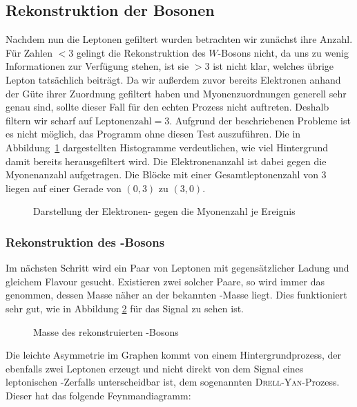 \subsection{Rekonstruktion der Bosonen}
Nachdem nun die Leptonen gefiltert wurden betrachten wir zunächst ihre Anzahl.
Für Zahlen $< 3$ gelingt die Rekonstruktion des $W$-Bosons nicht, da uns zu
wenig Informationen zur Verfügung stehen, ist sie $> 3$ ist nicht klar, welches
übrige Lepton tatsächlich beiträgt. Da wir außerdem zuvor bereits Elektronen
anhand der Güte ihrer Zuordnung gefiltert haben und Myonenzuordnungen generell
sehr genau sind, sollte dieser Fall für den echten Prozess nicht auftreten.
Deshalb filtern wir scharf auf $\text{Leptonenzahl} = 3$. Aufgrund der
beschriebenen Probleme ist es nicht möglich, das Programm ohne diesen Test
auszuführen. Die in Abbildung~\ref{fig:el_mu_n} dargestellten Histogramme verdeutlichen, wie viel
Hintergrund damit bereits herausgefiltert wird. Die Elektronenanzahl ist dabei
gegen die Myonenanzahl aufgetragen. Die Blöcke mit einer Gesamtleptonenzahl von
3 liegen auf einer Gerade von $(0, 3)$ zu $(3,0)$.

\begin{figure}
  
  
  
  
  
  \caption{Darstellung der Elektronen- gegen die Myonenzahl je Ereignis}
  \label{fig:el_mu_n}
\end{figure}

\subsubsection{Rekonstruktion des \Z-Bosons}
Im nächsten Schritt wird ein Paar von Leptonen mit gegensätzlicher Ladung und
gleichem Flavour gesucht. Existieren zwei solcher Paare, so wird immer das
genommen, dessen Masse näher an der bekannten \Z-Masse liegt. Dies funktioniert
sehr gut, wie in Abbildung \ref{fig:signal_zmasse} für das Signal zu sehen ist.
\begin{figure}
  \begin{center}
    
  \end{center}
  \caption{Masse des rekonstruierten \Z-Bosons}
  \label{fig:signal_zmasse}
\end{figure}

Die leichte Asymmetrie im Graphen kommt von einem Hintergrundprozess, der
ebenfalls zwei Leptonen erzeugt und nicht direkt von dem Signal eines
leptonischen \Z-Zerfalls unterscheidbar ist, dem sogenannten
\textsc{Drell}-\textsc{Yan}-Prozess. Dieser hat das folgende Feynmandiagramm:
\begin{center}
  
\end{center}

